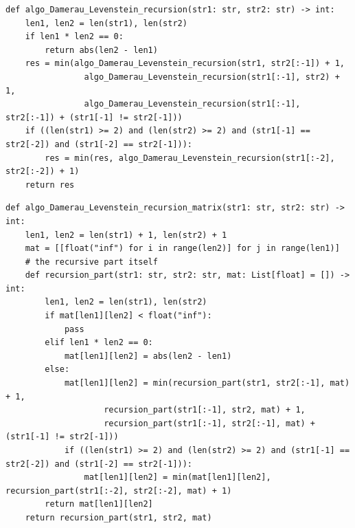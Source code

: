 \documentclass[a4paper,12pt]{article}
\begin{document}
\begin{lstlisting}[caption=реализация рекурсивного алгоритма Дамерау-Левенштейна]
def algo_Damerau_Levenstein_recursion(str1: str, str2: str) -> int:
    len1, len2 = len(str1), len(str2)
    if len1 * len2 == 0:
        return abs(len2 - len1)
    res = min(algo_Damerau_Levenstein_recursion(str1, str2[:-1]) + 1,
                algo_Damerau_Levenstein_recursion(str1[:-1], str2) + 1,
                algo_Damerau_Levenstein_recursion(str1[:-1], str2[:-1]) + (str1[-1] != str2[-1]))
    if ((len(str1) >= 2) and (len(str2) >= 2) and (str1[-1] == str2[-2]) and (str1[-2] == str2[-1])):
        res = min(res, algo_Damerau_Levenstein_recursion(str1[:-2], str2[:-2]) + 1)
    return res
\end{lstlisting}
\begin{lstlisting}[caption=реализация рекурсивно-матричного алгоритма Дамерау-Левенштейна]
def algo_Damerau_Levenstein_recursion_matrix(str1: str, str2: str) -> int:
    len1, len2 = len(str1) + 1, len(str2) + 1
    mat = [[float("inf") for i in range(len2)] for j in range(len1)]
    # the recursive part itself
    def recursion_part(str1: str, str2: str, mat: List[float] = []) -> int:
        len1, len2 = len(str1), len(str2)
        if mat[len1][len2] < float("inf"):
            pass
        elif len1 * len2 == 0:
            mat[len1][len2] = abs(len2 - len1)
        else:
            mat[len1][len2] = min(recursion_part(str1, str2[:-1], mat) + 1,
                    recursion_part(str1[:-1], str2, mat) + 1,
                    recursion_part(str1[:-1], str2[:-1], mat) + (str1[-1] != str2[-1]))
            if ((len(str1) >= 2) and (len(str2) >= 2) and (str1[-1] == str2[-2]) and (str1[-2] == str2[-1])):
                mat[len1][len2] = min(mat[len1][len2], recursion_part(str1[:-2], str2[:-2], mat) + 1)
        return mat[len1][len2]
    return recursion_part(str1, str2, mat)
\end{lstlisting}
\end{document}
